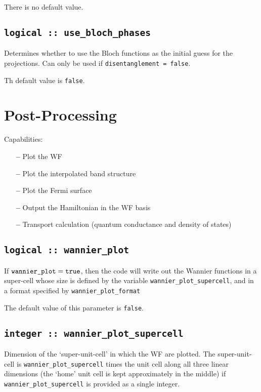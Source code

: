 There is no default value.

\subsection[use\_bloch\_phases]{\tt logical :: use\_bloch\_phases}

Determines whether to use the Bloch functions as the
initial guess for the projections. Can only be used if
\verb#disentanglement = false#. 

Th default value is \verb#false#.


\section{Post-Processing}
\label{sec:post-p}

 Capabilities:

\begin{itemize}
\item[{\bf --}]  Plot the WF
\item[{\bf --}]  Plot the interpolated band structure 		     
\item[{\bf --}]  Plot the Fermi surface 
\item[{\bf --}]  Output the Hamiltonian in the WF basis			     
\item[{\bf --}]  Transport calculation (quantum conductance and
  density of states)			     
\end{itemize}


\subsection[wannier\_plot]{\tt logical :: wannier\_plot}

If $\verb#wannier_plot#=\verb#true#$, then the code will write out the
Wannier functions in a super-cell whose size is defined by the
variable \verb#wannier_plot_supercell#, and in a format specified by
\verb#wannier_plot_format#

The default value of this parameter is \verb#false#.

\subsection[wannier\_plot\_supercell]{\tt integer :: wannier\_plot\_supercell}

Dimension of the `super-unit-cell' in which the WF are
plotted. The super-unit-cell is \verb#wannier_plot_supercell# times
the unit cell along all three linear dimensions (the `home' unit cell
is kept approximately in the middle) if \verb#wannier_plot_supercell#
is provided as a single integer.

